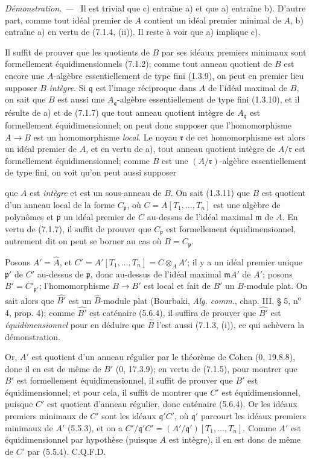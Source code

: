 \documentclass[10pt,oneside]{book}
\newcommand{\oldpage}[2][]{%
  \setcounter{footnote}{0}%
  \marginpar{\scriptsize\textbf{#1}~|~#2}\ignorespaces}
\newenvironment{proof}{%
  \par\medskip\noindent\textit{Démonstration. ---\ }}{\par}
\begin{document}
\begin{proof}
Il est trivial que c) entraîne a) et que a) entraîne b). D'autre part,
comme tout idéal premier de $A$ contient un idéal premier minimal de $A$,
b) entraîne a) en vertu de (7.1.4, (ii)). Il reste à voir que a) implique
c).

Il suffit de prouver que les quotients de $B$ par ses idéaux premiers
minimaux sont formellement équidimensionnels (7.1.2); comme tout anneau
quotient de $B$ est encore une $A$-algèbre essentiellement de type fini
(1.3.9), on peut en premier lieu supposer $B$ \emph{intègre}. Si
$\mathfrak q$ est
l'image réciproque dans $A$ de l'idéal maximal de $B$, on sait que $B$ est
aussi une $A_{\mathfrak q}$-algèbre essentiellement de type fini (1.3.10),
et il résulte de a) et de (7.1.7) que tout anneau quotient intègre de
$A_{\mathfrak q}$ est formellement équidimensionnel; on peut donc supposer
que l'homomorphisme $A\to B$ est un homomorphisme \emph{local}. Le noyau
$\mathfrak r$ de cet homomorphisme est alors un idéal premier de $A$, et en
vertu de a), tout anneau quotient intègre de $A/\mathfrak r$ est
formellement équidimensionnel; comme $B$ est une
$(A/\mathfrak r)$-algèbre essentiellement de type fini, on voit qu'on peut
aussi supposer

\oldpage[IV-2]{186}
que $A$ est \emph{intègre} et est un sous-anneau de $B$. On sait (1.3.11)
que $B$
est quotient d'un anneau local de la forme $C_{\mathfrak p}$, où
$C=A[T_1,\ldots,T_n]$ est une algèbre de polynômes et $\mathfrak p$ un
idéal premier de $C$ au-dessus de l'idéal maximal $\mathfrak m$ de $A$. En
vertu de (7.1.7), il suffit de prouver que $C_{\mathfrak p}$ est
formellement équidimensionnel, autrement dit on peut se borner au cas où
$B=C_{\mathfrak p}$.

Posons $A'=\widehat A$, et
$C'=A'[T_1,\ldots,T_n]=C\otimes_AA'$; il y a un idéal premier unique
$\mathfrak p'$ de $C'$ au-dessus de $\mathfrak p$, donc au-dessus de
l'idéal maximal $\mathfrak mA'$ de $A'$; posons $B'=C'_{\mathfrak p'}$;
l'homomorphisme $B\to B'$ est local et fait de $B'$ un $B$-module plat. On
sait alors que $\widehat {B'}$ est un $\widehat B$-module plat (Bourbaki,
\emph{Alg. comm.}, chap. III, § 5, n\textsuperscript{o} 4, prop. 4); comme
$\widehat {B'}$ est caténaire (5.6.4), il suffira de prouver que
$\widehat {B'}$ est \emph{équidimensionnel} pour en déduire que $\widehat B$ l'est
aussi (7.1.3, (i)), ce qui achèvera la démonstration.

Or, $A'$ est quotient d'un anneau régulier par le théorème de Cohen (0,
19.8.8), donc il en est de même de $B'$ (0, 17.3.9); en vertu de (7.1.5),
pour montrer que $B'$ est formellement équidimensionnel, il suffit de
prouver que $B'$ est équidimensionnel; et pour cela, il suffit de montrer
que $C'$ est équidimensionnel, puisque $C'$ est quotient d'anneau régulier,
donc caténaire (5.6.4). Or les idéaux premiers minimaux de $C'$ sont les
idéaux $\mathfrak q'C'$, où $\mathfrak q'$ parcourt les idéaux premiers
minimaux de $A'$ (5.5.3), et on a
$C'/\mathfrak q'C'=(A'/\mathfrak q')[T_1,\ldots,T_n]$. Comme $A'$ est
équidimensionnel par hypothèse (puisque $A$ est intègre), il en est donc de
même de $C'$ par (5.5.4). C.Q.F.D.
\end{proof}
\end{document}
